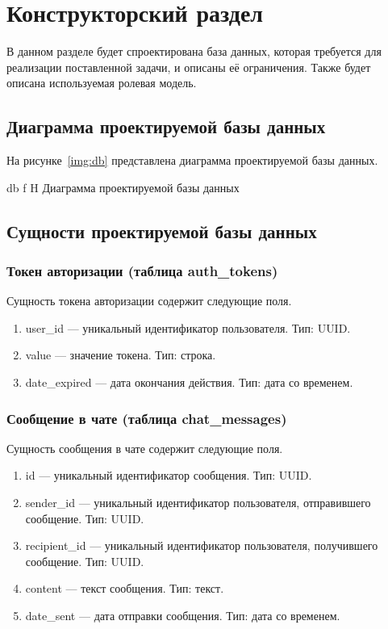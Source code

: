 \chapter{Конструкторский раздел}

В данном разделе будет спроектирована база данных, которая требуется для реализации поставленной задачи, и описаны её ограничения. Также будет описана используемая ролевая модель.

\section{Диаграмма проектируемой базы данных}

На рисунке~\ref{img:db} представлена диаграмма проектируемой базы данных.

{db}
{f}
{H}
{\textwidth}
{Диаграмма проектируемой базы данных}

\section{Сущности проектируемой базы данных}

\subsection{Токен авторизации (таблица auth\_tokens)}

Сущность токена авторизации содержит следующие поля.

\begin{enumerate}
	\item user\_id --- уникальный идентификатор пользователя. Тип: UUID.
	\item value --- значение токена. Тип: строка.
	\item date\_expired --- дата окончания действия. Тип: дата со временем.
\end{enumerate}

\subsection{Сообщение в чате (таблица chat\_messages)}

Сущность сообщения в чате содержит следующие поля.

\begin{enumerate}
	\item id --- уникальный идентификатор сообщения. Тип: UUID.
	\item sender\_id --- уникальный идентификатор пользователя, отправившего сообщение. Тип: UUID.
	\item recipient\_id --- уникальный идентификатор пользователя, получившего сообщение. Тип: UUID.
	\item content --- текст сообщения. Тип: текст.
	\item date\_sent --- дата отправки сообщения. Тип: дата со временем.
\end{enumerate}

